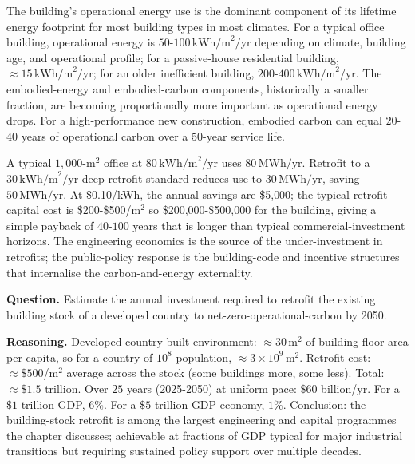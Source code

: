 The building's operational energy use is the dominant component of its lifetime energy footprint for most building types in most climates. For a typical office building, operational energy is $50$-$100\,\text{kWh/m}^2/\text{yr}$ depending on climate, building age, and operational profile; for a passive-house residential building, $\approx 15\,\text{kWh/m}^2/\text{yr}$; for an older inefficient building, $200$-$400\,\text{kWh/m}^2/\text{yr}$. The embodied-energy and embodied-carbon components, historically a smaller fraction, are becoming proportionally more important as operational energy drops. For a high-performance new construction, embodied carbon can equal $20$-$40$ years of operational carbon over a $50$-year service life.

\begin{archetype}
A typical $1{,}000$-m$^2$ office at $80\,\text{kWh/m}^2/\text{yr}$ uses $80\,\text{MWh/yr}$. Retrofit to a $30\,\text{kWh/m}^2/\text{yr}$ deep-retrofit standard reduces use to $30\,\text{MWh/yr}$, saving $50\,\text{MWh/yr}$. At \$0.10/kWh, the annual savings are \$5{,}000; the typical retrofit capital cost is \$200-\$500/m$^2$ so \$200{,}000-\$500{,}000 for the building, giving a simple payback of $40$-$100$ years that is longer than typical commercial-investment horizons. The engineering economics is the source of the under-investment in retrofits; the public-policy response is the building-code and incentive structures that internalise the carbon-and-energy externality.
\end{archetype}

\begin{estimation}
\textbf{Question.} Estimate the annual investment required to retrofit the existing building stock of a developed country to net-zero-operational-carbon by 2050.

\textbf{Reasoning.} Developed-country built environment: $\approx 30\,\text{m}^2$ of building floor area per capita, so for a country of $10^8$ population, $\approx 3 \times 10^9\,\text{m}^2$. Retrofit cost: $\approx \$500$/m$^2$ average across the stock (some buildings more, some less). Total: $\approx \$1.5$ trillion. Over $25$ years (2025-2050) at uniform pace: $\$60$ billion/yr. For a $\$1$ trillion GDP, $6\%$. For a $\$5$ trillion GDP economy, $1\%$. Conclusion: the building-stock retrofit is among the largest engineering and capital programmes the chapter discusses; achievable at fractions of GDP typical for major industrial transitions but requiring sustained policy support over multiple decades.
\end{estimation}

